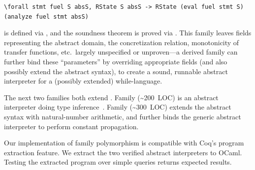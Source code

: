 \begin{centered}
\begin{minipage}{.91\textwidth}
\begin{lstlisting}[basicstyle=\fontsize{8.25}{9}\ttfamily]
\forall stmt fuel S absS, RState S absS -> RState (eval fuel stmt S) (analyze fuel stmt absS)
\end{lstlisting}
\end{minipage}
\end{centered}

\noindent
{} is defined via , and the soundness theorem
is proved via .
This family leaves fields representing the abstract domain, the
concretization relation, monotonicity of transfer functions, etc.\ 
largely unspecified or unproven---a derived family can further bind
these ``parameters'' by overriding appropriate fields (and also possibly
extend the abstract syntax), to create a sound, runnable abstract
interpreter for a (possibly extended) while-language.

The next two families both extend .
Family  (\textasciitilde200~LOC) is an abstract
interpreter doing type inference~\cite{cousot1997types}.
Family  (\textasciitilde300~LOC) extends the abstract syntax
with natural-number arithmetic,
and further binds the generic abstract interpreter to perform constant propagation.
%

Our implementation of family polymorphism is compatible with Coq's
program extraction feature.
We extract the two verified abstract interpreters to OCaml.
Testing the extracted program over simple queries returns expected results.


